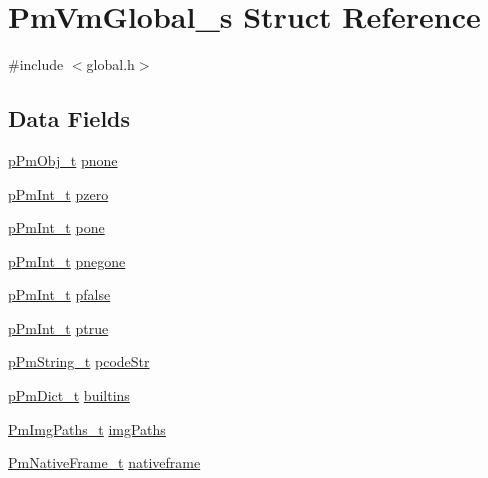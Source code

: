 \hypertarget{struct_pm_vm_global__s}{\section{Pm\-Vm\-Global\-\_\-s Struct Reference}
\label{struct_pm_vm_global__s}
}


{\ttfamily \#include $<$global.\-h$>$}

\subsection*{Data Fields}
\begin{DoxyCompactItemize}
\item 
\hyperlink{obj_8h_af293479fa3f9d92b941ee7445ad3960e}{p\-Pm\-Obj\-\_\-t} \hyperlink{struct_pm_vm_global__s_a5c503e0cc9f53fd09bc0aa60e3518671}{pnone}
\item 
\hyperlink{int_8h_a4e838c33f90195d32610ed1f414892d9}{p\-Pm\-Int\-\_\-t} \hyperlink{struct_pm_vm_global__s_a28d5b7332d6e8e9e0cba479873d9d189}{pzero}
\item 
\hyperlink{int_8h_a4e838c33f90195d32610ed1f414892d9}{p\-Pm\-Int\-\_\-t} \hyperlink{struct_pm_vm_global__s_aab300030689a352a16ddf31192091e2b}{pone}
\item 
\hyperlink{int_8h_a4e838c33f90195d32610ed1f414892d9}{p\-Pm\-Int\-\_\-t} \hyperlink{struct_pm_vm_global__s_a973c8cde94c705c1be77dac434dc6cc7}{pnegone}
\item 
\hyperlink{int_8h_a4e838c33f90195d32610ed1f414892d9}{p\-Pm\-Int\-\_\-t} \hyperlink{struct_pm_vm_global__s_a91bb3e3da979ed5723c2d95a51a91f57}{pfalse}
\item 
\hyperlink{int_8h_a4e838c33f90195d32610ed1f414892d9}{p\-Pm\-Int\-\_\-t} \hyperlink{struct_pm_vm_global__s_a92e7f34c075e121ca13696febf0ab6ea}{ptrue}
\item 
\hyperlink{strobj_8h_adef544ba13f4cc6288d3965f3a17d361}{p\-Pm\-String\-\_\-t} \hyperlink{struct_pm_vm_global__s_aaccbf51ac51dc535f1cc4d2986af6266}{pcode\-Str}
\item 
\hyperlink{dict_8h_a32b81dc9e05f3a84863319301daf749b}{p\-Pm\-Dict\-\_\-t} \hyperlink{struct_pm_vm_global__s_a1e7d13661ffdd00ff167d9db9c880df5}{builtins}
\item 
\hyperlink{img_8h_a7ff9d445c13b7a30e8d5886de4baf36c}{Pm\-Img\-Paths\-\_\-t} \hyperlink{struct_pm_vm_global__s_af56e5a34119a2803b3f1a865bae755bb}{img\-Paths}
\item 
\hyperlink{frame_8h_a57a44d4519a313492cf6aa89aaea5d58}{Pm\-Native\-Frame\-\_\-t} \hyperlink{struct_pm_vm_global__s_a950d59b1e8c7c2c4e2421bb2e935f2b1}{nativeframe}

\end{DoxyCompactItemize}
